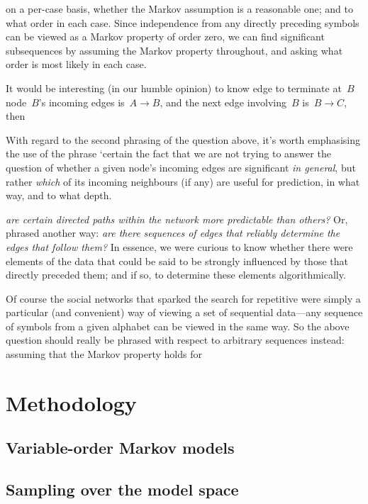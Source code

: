 \documentclass[11pt,a4paper]{article}
\begin{document}
on a per-case basis, whether the Markov assumption is a reasonable one; and to
what order in each case. Since independence from any directly preceding symbols
can be viewed as a Markov property of order zero, we can find significant
subsequences by assuming the Markov property throughout, and asking what order
is most likely in each case.





It would be interesting (in our humble opinion) to
know edge to terminate at~$B$ node~$B$'s incoming edges is~$A \longrightarrow
B$, and the next edge involving~$B$ is~$B \longrightarrow C$, then 

With regard to the second phrasing of the question above, it's worth emphasising
the use of the phrase `certain the fact that we are not trying to answer the question of whether a given node's
incoming edges are significant \emph{in general}, but rather \emph{which} of its
incoming neighbours (if any) are useful for prediction, in what way, and to what
depth.


\textit{are certain directed paths
within the network more predictable than others?} Or, phrased another way:
\textit{are there sequences of edges that reliably determine the edges that
follow them?} In essence, we were curious to know whether there were elements of
the data that could be said to be strongly influenced by those that directly
preceded them; and if so, to determine these elements algorithmically.

Of course the social networks that sparked the search for repetitive were simply
a particular (and convenient) way of viewing a set of sequential data---any
sequence of symbols from a given alphabet can be viewed in the same way. So the
above question should really be phrased with respect to arbitrary sequences
instead: assuming that the Markov property holds for 

\section{Methodology} %

\subsection{Variable-order Markov models} %

\subsection{Sampling over the model space} %
\end{document}
